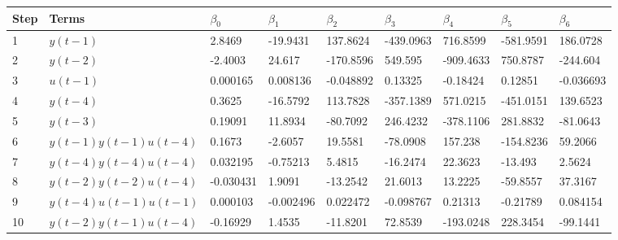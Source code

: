\begin{tabular}{lllllllll}
Step & Terms & $\beta_{0}$ & $\beta_{1}$ & $\beta_{2}$ & $\beta_{3}$ & $\beta_{4}$ & $\beta_{5}$ & $\beta_{6}$ \\ 
\hline 
1 & $y(t-1)$ & 2.8469 & -19.9431 & 137.8624 & -439.0963 & 716.8599 & -581.9591 & 186.0728 \\ 
2 & $y(t-2)$ & -2.4003 & 24.617 & -170.8596 & 549.595 & -909.4633 & 750.8787 & -244.604 \\ 
3 & $u(t-1)$ & 0.000165 & 0.008136 & -0.048892 & 0.13325 & -0.18424 & 0.12851 & -0.036693 \\ 
4 & $y(t-4)$ & 0.3625 & -16.5792 & 113.7828 & -357.1389 & 571.0215 & -451.0151 & 139.6523 \\ 
5 & $y(t-3)$ & 0.19091 & 11.8934 & -80.7092 & 246.4232 & -378.1106 & 281.8832 & -81.0643 \\ 
6 & $y(t-1)y(t-1)u(t-4)$ & 0.1673 & -2.6057 & 19.5581 & -78.0908 & 157.238 & -154.8236 & 59.2066 \\ 
7 & $y(t-4)y(t-4)u(t-4)$ & 0.032195 & -0.75213 & 5.4815 & -16.2474 & 22.3623 & -13.493 & 2.5624 \\ 
8 & $y(t-2)y(t-2)u(t-4)$ & -0.030431 & 1.9091 & -13.2542 & 21.6013 & 13.2225 & -59.8557 & 37.3167 \\ 
9 & $y(t-4)u(t-1)u(t-1)$ & 0.000103 & -0.002496 & 0.022472 & -0.098767 & 0.21313 & -0.21789 & 0.084154 \\ 
10 & $y(t-2)y(t-1)u(t-4)$ & -0.16929 & 1.4535 & -11.8201 & 72.8539 & -193.0248 & 228.3454 & -99.1441 \\ 
\hline 
\end{tabular}